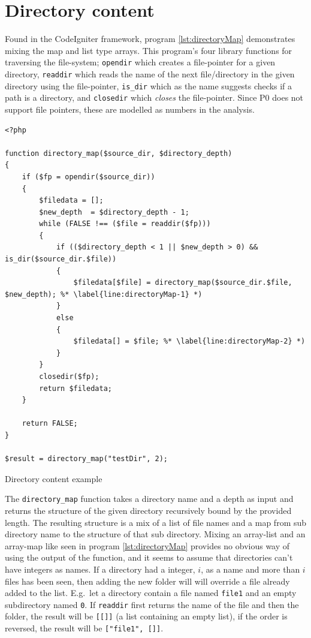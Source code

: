 \section{Directory content}
\label{sec:directoryContent}
Found in the CodeIgniter framework, program \ref{lst:directoryMap} demonstrates mixing the map and list type arrays. This program's four library functions for traversing the file-system; \texttt{opendir} which creates a file-pointer for a given directory, \texttt{readdir} which reads the name of the next file/directory in the given directory using the file-pointer, \texttt{is\_dir} which as the name suggests checks if a path is a directory, and \texttt{closedir} which \emph{closes} the file-pointer. Since P0 does not support file pointers, these are modelled as numbers in the analysis. 


\begin{program}
\begin{lstlisting}
<?php

function directory_map($source_dir, $directory_depth)
{
    if ($fp = opendir($source_dir))
    {
        $filedata = [];
        $new_depth	= $directory_depth - 1;
        while (FALSE !== ($file = readdir($fp)))
        {
            if (($directory_depth < 1 || $new_depth > 0) && is_dir($source_dir.$file))
            {
                $filedata[$file] = directory_map($source_dir.$file, $new_depth); %* \label{line:directoryMap-1} *)
            }
            else
            {
                $filedata[] = $file; %* \label{line:directoryMap-2} *)
            }
        }
        closedir($fp);
        return $filedata;
    }

    return FALSE;
}

$result = directory_map("testDir", 2);
\end{lstlisting}
\caption{Directory content example}
\label{lst:directoryMap}
\end{program}


The \texttt{directory\_map} function takes a directory name and a depth as input and returns the structure of the given directory recursively bound by the provided length. The resulting structure is a mix of a list of file names and a map from sub directory name to the structure of that sub directory. Mixing an array-list and an array-map like seen in program \ref{lst:directoryMap} provides no obvious way of using the output of the function, and it seems to assume that directories can't have integers as names. If a directory had a integer, $i$, as a name and more than $i$ files has been seen, then adding the new folder will will override a file already added to the list. E.g.\ let a directory contain a file named \texttt{file1} and an empty subdirectory named \texttt{0}. If \texttt{readdir} first returns the name of the file and then the folder, the result will be \texttt{[[]]} (a list containing an empty list), if the order is reversed, the result will be \texttt{["file1", []]}.

